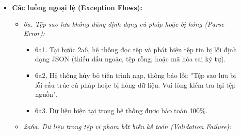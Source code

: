 \documentclass[11pt,a4paper]{article}
\providecommand{\tightlist}{
  \setlength{\itemsep}{0pt}\setlength{\parskip}{0pt}}
\begin{document}
\begin{itemize}
\begin{itemize}
\begin{itemize}
      \begin{enumerate}
      \def\labelenumi{\arabic{enumi}.}
      \tightlist
      \item
        Kiểm toán số dư ví: Quét toàn bộ lịch sử giao dịch của từng ví,
        tính số dư độc lập theo công thức \texttt{BR-FIN-02} và so sánh
        với số dư ghi nhận của từng ví. Kiểm tra sai số \(\Delta = 0\).
      \item
        Kiểm toán ghi sổ kép chuyển tiền: Quét toàn bộ bảng
        \texttt{transfers}, kiểm tra số tiền trừ tại ví nguồn bằng chính
        xác số tiền cộng tại ví đích theo \texttt{BR-FIN-03}.
      \item
        Kiểm toán liên kết danh mục: Quét bảng \texttt{transactions},
        kiểm tra không có giao dịch nào tham chiếu danh mục mồ côi hoặc
        không khớp \texttt{Type} theo \texttt{BR-FIN-04}.
      \item
        Kiểm toán bất biến công nợ: Kiểm tra toàn bộ các đối tác có số
        dư nợ phải thu và nợ phải trả đều \(\ge 0\) theo
        \texttt{BR-FIN-07}.
      \end{enumerate}
    \item
      2b3. Hệ thống tổng hợp kết quả thành Báo cáo Kiểm toán Toàn vẹn Dữ
      liệu (Audit Report).
    \item
      2b4. Nếu tất cả đều ĐẠT, hệ thống hiển thị dấu tích xanh và thông
      báo: "Cơ sở dữ liệu hoàn toàn nhất quán và toàn vẹn 100\%".
    \item
      2b5. Nếu phát hiện sai lệch, hệ thống đánh dấu đỏ, liệt kê chi
      tiết mã giao dịch, số tiền chênh lệch và hướng dẫn người dùng biện
      pháp xử lý.
    \end{itemize}
  \end{itemize}
\item
  \textbf{Các luồng ngoại lệ (Exception Flows):}

  \begin{itemize}
  \tightlist
  \item
    \emph{6a. Tệp sao lưu không đúng định dạng cú pháp hoặc bị hỏng
    (Parse Error):}

    \begin{itemize}
    \tightlist
    \item
      6a1. Tại bước 2a6, hệ thống đọc tệp và phát hiện tệp tin bị lỗi
      định dạng JSON (thiếu dấu ngoặc, tệp rỗng, hoặc mã hóa sai ký tự).
    \item
      6a2. Hệ thống hủy bỏ tiến trình nạp, thông báo lỗi: "Tệp sao lưu
      bị lỗi cấu trúc cú pháp hoặc bị hỏng dữ liệu. Vui lòng kiểm tra
      lại tệp nguồn".
    \item
      6a3. Dữ liệu hiện tại trong hệ thống được bảo toàn 100\%.
    \end{itemize}
  \item
    \emph{2a6a. Dữ liệu trong tệp vi phạm bất biến kế toán (Validation
    Failure):}


\end{itemize}
\end{itemize}
\end{document}
